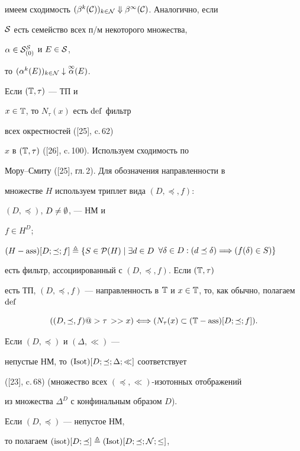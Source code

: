 имеем сходимость ${({{\beta}^k}({\cal C}))_{k \in {\cal N}}}


\Downarrow {{\beta}^\infty}({\cal C})$. Аналогично, если


${\cal S}$ есть семейство всех п/м некоторого множества,


$\alpha \in {\cal S}^{\cal S}_{(0)}$ и $E \in {\cal S}$,


то ${({{\alpha}^k}(E))_{k \in {\cal N}}}


\downarrow \up{\infty}{\alpha}(E)$.


Если $({\Bbb T},\tau)$ --- ТП и


$x \in {\Bbb T}$, то ${N_\tau}(x)$ есть $\operatorname{def}$ фильтр


всех окрестностей ([25], c.\,62)


$x$ в $({\Bbb T},\tau)$ ([26], c.\,100). Используем сходимость по


Мору--Смиту ([25], гл.\,2). Для обозначения направленности в


множестве $H$ используем триплет вида $(D,\preceq,f)$:


$(D,\preceq)$, $D \ne \emptyset$, --- НМ и


$f \in {H^D}$;


$(H - {\ass})[D;\preceq;f] \stac \{S \in {{\cal P}(H)} \mid


\exi{d} \in D$ $\fo{\delta} \in D:(d \preceq \delta) \Lo


(f(\delta) \in S)\}$


есть фильтр, ассоциированный с $(D,\preceq,f)$. Если $({\Bbb T},\tau)$


есть ТП, $(D,\preceq,f)$ --- направленность в ${\Bbb T}$ и $x \in


{\Bbb T}$, то, как обычно, полагаем $\Def$


$$


((D,\preceq,f) @>{\tau\,}>> x) \Longleftrightarrow ({N_\tau}(x)


\subset ({\Bbb T} - {\ass})[D;\preceq;f]).


$$


Если $(D,\preceq)$ и $(\Delta,\ll)$ ---


непустые НМ, то $(\operatorname{Isot})[D;\preceq;\Delta;\ll]$ соответствует


([23], c.\,68) (множество всех $(\preceq,\ll)$-изотонных отображений


из множества ${{\Delta}^D}$ с конфинальным образом $D$).


Если $(D,\preceq)$ --- непустое НМ,


то полагаем $(\operatorname{isot})[D;\preceq] \triangleq (\operatorname{Isot})[D;\preceq;{\cal N};\le]$,


